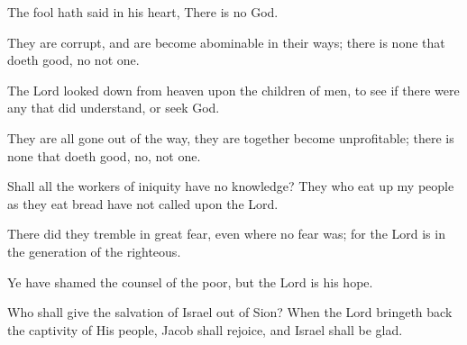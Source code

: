 The fool hath said in his heart, There is no God.

They are corrupt, and are become abominable in their ways; there is none that doeth good, no not one.

The Lord looked down from heaven upon the children of men, to see if there were any that did understand, or seek God.

They are all gone out of the way, they are together become unprofitable; there is none that doeth good, no, not one.

Shall all the workers of iniquity have no knowledge? They who eat up my people as they eat bread have not called upon the Lord.

There did they tremble in great fear, even where no fear was; for the Lord is in the generation of the righteous.

Ye have shamed the counsel of the poor, but the Lord is his hope.

Who shall give the salvation of Israel out of Sion? When the Lord bringeth back the captivity of His people, Jacob shall rejoice, and Israel shall be glad.
